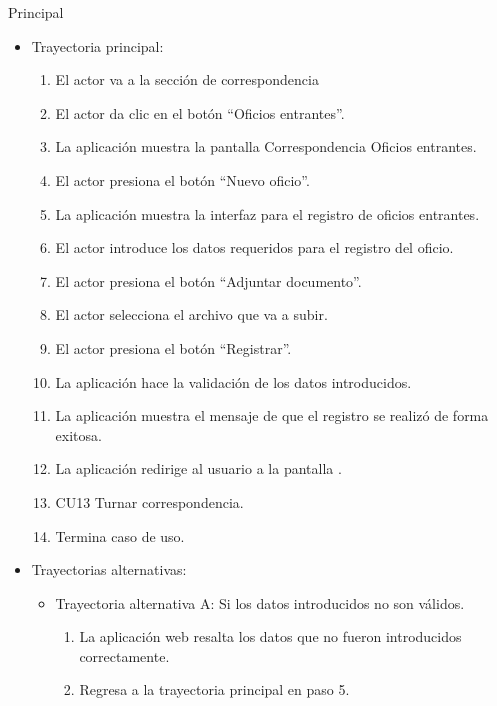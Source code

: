 \begin{UCtrayectoria}{Principal}
\begin{itemize}
	\item Trayectoria principal:
	\begin{enumerate}
		\item	El actor va a la sección de correspondencia 
\item	El actor da clic en el botón “Oficios entrantes”.
\item	La aplicación muestra la pantalla  Correspondencia Oficios entrantes.
\item	El actor presiona el botón “Nuevo oficio”.
\item	La aplicación muestra la interfaz  para el registro de oficios entrantes.
\item	El actor introduce los datos requeridos para el registro del oficio.
\item	El actor presiona el botón “Adjuntar documento”.
\item	El actor selecciona el archivo que va a subir.
\item	El actor presiona el botón “Registrar”.
\item	La aplicación hace la validación de los datos introducidos.
\item	La aplicación muestra el mensaje  de que el registro se realizó de forma exitosa.
\item	La aplicación redirige al usuario a la pantalla .
\item	CU13 Turnar correspondencia.
\item	Termina caso de uso.

	\end{enumerate}
	
	\item Trayectorias alternativas:
	\begin{itemize}
		\item Trayectoria alternativa A: Si los datos introducidos no son válidos.
			\begin{enumerate}
				\item La aplicación web resalta los datos que no fueron introducidos correctamente. 
				\item Regresa a la trayectoria principal en paso 5.
			\end{enumerate}
	\end{itemize}
\end{itemize}
\newpage

\end{UCtrayectoria}
